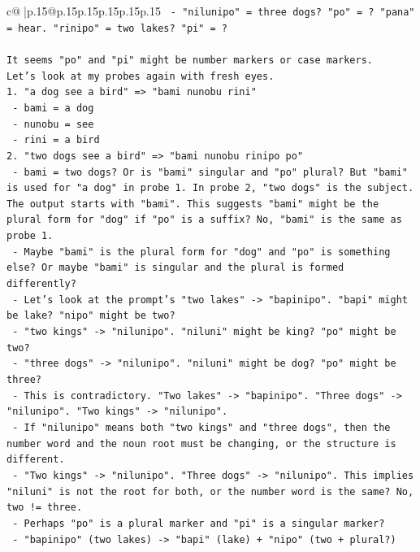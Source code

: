 \documentclass{article}
\begin{document}
{\begin{supertabular}{c@{$\;$}|p{.15\linewidth}@{}p{.15\linewidth}p{.15\linewidth}p{.15\linewidth}p{.15\linewidth}p{.15\linewidth}}
{{{\texttt{  {-} "nilunipo" = three dogs? "po" = ? "pana" = hear. "rinipo" = two lakes? "pi" = ?} \\
\\ 
\texttt{It seems "po" and "pi" might be number markers or case markers.} \\
\texttt{Let's look at my probes again with fresh eyes.} \\
\texttt{1. "a dog see a bird" => "bami nunobu rini"} \\
\texttt{   {-} bami = a dog} \\
\texttt{   {-} nunobu = see} \\
\texttt{   {-} rini = a bird} \\
\texttt{2. "two dogs see a bird" => "bami nunobu rinipo po"} \\
\texttt{   {-} bami = two dogs? Or is "bami" singular and "po" plural? But "bami" is used for "a dog" in probe 1. In probe 2, "two dogs" is the subject. The output starts with "bami". This suggests "bami" might be the plural form for "dog" if "po" is a suffix? No, "bami" is the same as probe 1.} \\
\texttt{   {-} Maybe "bami" is the plural form for "dog" and "po" is something else? Or maybe "bami" is singular and the plural is formed differently?} \\
\texttt{   {-} Let's look at the prompt's "two lakes" {-}> "bapinipo". "bapi" might be lake? "nipo" might be two?} \\
\texttt{   {-} "two kings" {-}> "nilunipo". "niluni" might be king? "po" might be two?} \\
\texttt{   {-} "three dogs" {-}> "nilunipo". "niluni" might be dog? "po" might be three?} \\
\texttt{   {-} This is contradictory. "Two lakes" {-}> "bapinipo". "Three dogs" {-}> "nilunipo". "Two kings" {-}> "nilunipo".} \\
\texttt{   {-} If "nilunipo" means both "two kings" and "three dogs", then the number word and the noun root must be changing, or the structure is different.} \\
\texttt{   {-} "Two kings" {-}> "nilunipo". "Three dogs" {-}> "nilunipo". This implies "niluni" is not the root for both, or the number word is the same? No, two != three.} \\
\texttt{   {-} Perhaps "po" is a plural marker and "pi" is a singular marker?} \\
\texttt{     {-} "bapinipo" (two lakes) {-}> "bapi" (lake) + "nipo" (two + plural?)} \\
}}}
\end{supertabular}}
\end{document}
